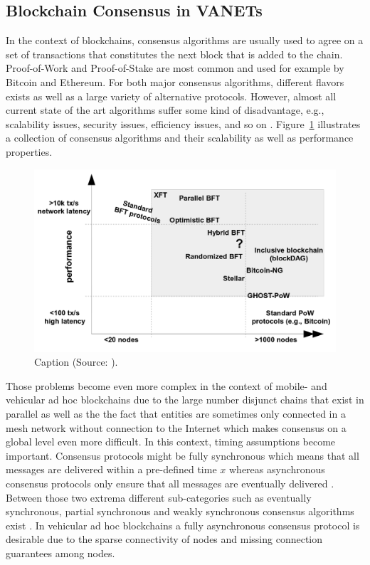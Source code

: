 \documentclass{llncs}
\begin{document}
{		%

		\subsection{Blockchain Consensus in VANETs}
			\label{ss:consensus}
			
			In the context of blockchains, consensus algorithms are usually used to agree on a set of transactions that constitutes the next block that is added to the chain. Proof-of-Work \cite{nakamoto_bitcoin:2008} and Proof-of-Stake \cite{bibid} are most common and used for example by Bitcoin and Ethereum. For both major consensus algorithms, different flavors exists as well as a large variety of alternative protocols. However, almost all current state of the art algorithms suffer some kind of disadvantage, e.g., scalability issues, security issues, efficiency issues, and so on \cite{bibid}\cite{bibid}. Figure~\ref{fig:bft-scalability} illustrates a collection of consensus algorithms and their scalability as well as performance properties. 
			\begin{figure}[H]
				\centering
				\includegraphics[scale=0.25]{Figures/BFT/20180904_BFT-scalability.png}
				\caption{Caption (Source: \cite{vukolic2015quest}).}
				\label{fig:bft-scalability}
			\end{figure}
			Those problems become even more complex in the  context of mobile- and vehicular ad hoc blockchains due to the large number disjunct chains that exist in parallel as well as the the fact that entities are sometimes only connected in a mesh network without connection to the Internet which makes consensus on a global level even more difficult. In this context, timing assumptions become important. Consensus protocols might be fully synchronous which means that all messages are delivered within a pre-defined time  $x$ whereas asynchronous consensus protocols only ensure that all messages are eventually delivered \cite{bibid}. Between those two extrema different sub-categories such as eventually synchronous, partial synchronous and weakly synchronous consensus algorithms exist \cite{bibid}\cite{bibid}\cite{bibid}. In vehicular ad hoc blockchains a fully asynchronous consensus protocol is  desirable due to the sparse connectivity of nodes and missing connection guarantees among nodes.
						
}
\end{document}
